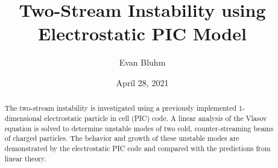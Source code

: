 \documentclass[%
 reprint,
 amsmath,amssymb,
 aps,
]{revtex4-2}
\begin{document}

\title{Two-Stream Instability using Electrostatic PIC Model}%

\author{Evan Bluhm}




\date{April 28, 2021}%
\begin{abstract}

The two-stream instability is investigated using a previously implemented 1-dimensional electrostatic particle in cell (PIC) code. A linear analysis of the Vlasov equation is solved to determine unstable modes of two cold, counter-streaming beams of charged particles. The behavior and growth of these unstable modes are demonstrated by the electrostatic PIC code and compared with the predictions from linear theory.

\end{abstract}
\end{document}
